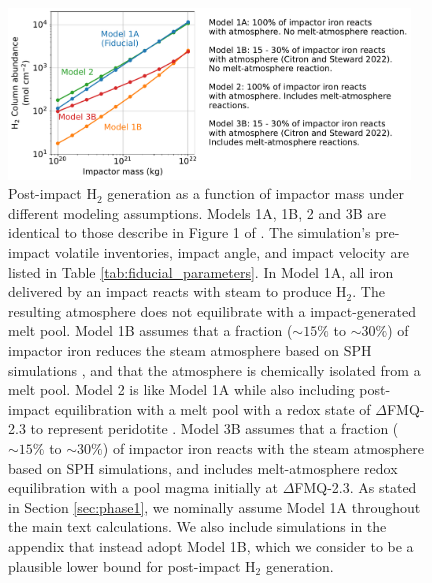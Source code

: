 \begin{figure}
  \centering
  \includegraphics[width=0.95\textwidth]{tex/5impacts/figures/melt_reaction_sup.pdf}
  \caption{Post-impact H$_2$ generation as a function of impactor mass under different modeling assumptions. Models 1A, 1B, 2 and 3B are identical to those describe in Figure 1 of \citet{Itcovitz_2022}. The simulation's pre-impact volatile inventories, impact angle, and impact velocity are listed in Table \ref{tab:fiducial_parameters}. In Model 1A, all iron delivered by an impact reacts with steam to produce H$_2$. The resulting atmosphere does not equilibrate with a impact-generated melt pool. Model 1B assumes that a fraction ($\sim 15\%$ to $\sim 30\%$) of impactor iron reduces the steam atmosphere based on SPH simulations \citep{Citron_2022}, and that the atmosphere is chemically isolated from a melt pool. Model 2 is like Model 1A while also including post-impact equilibration with a melt pool with a redox state of $\Delta$FMQ-2.3 to represent peridotite \citep{Itcovitz_2022}. Model 3B assumes that a fraction ($\sim 15\%$ to $\sim 30\%$) of impactor iron reacts with the steam atmosphere based on SPH simulations, and includes melt-atmosphere redox equilibration with a pool magma initially at $\Delta$FMQ-2.3. As stated in Section \ref{sec:phase1}, we nominally assume Model 1A throughout the main text calculations. We also include simulations in the appendix that instead adopt Model 1B, which we consider to be a plausible lower bound for post-impact H$_2$ generation.}
  \label{fig:melt_reaction_sup}
\end{figure}

